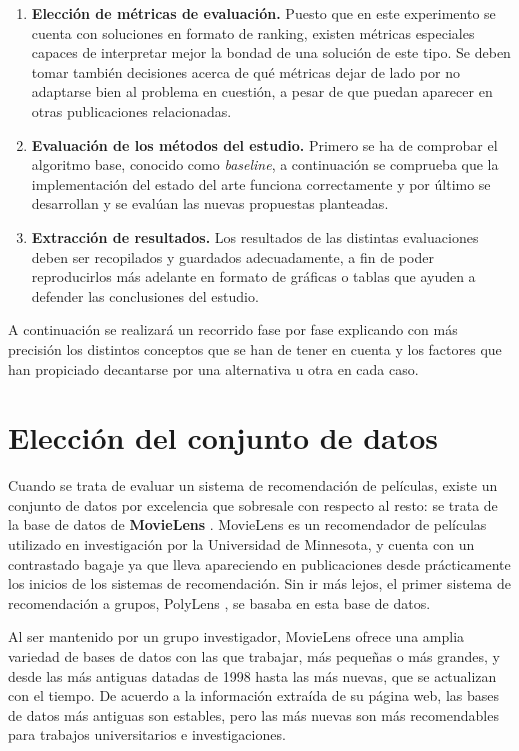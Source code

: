 \begin{enumerate}
	\item \textbf{Elección de métricas de evaluación.} Puesto que en este experimento se cuenta con soluciones en formato de ranking, existen métricas especiales capaces de interpretar mejor la bondad de una solución de este tipo. Se deben tomar también decisiones acerca de qué métricas dejar de lado por no adaptarse bien al problema en cuestión, a pesar de que puedan aparecer en otras publicaciones relacionadas.
	\item \textbf{Evaluación de los métodos del estudio.} Primero se ha de comprobar el algoritmo base, conocido como \textit{baseline}, a continuación se comprueba que la implementación del estado del arte funciona correctamente y por último se desarrollan y se evalúan las nuevas propuestas planteadas.
	\item \textbf{Extracción de resultados.} Los resultados de las distintas evaluaciones deben ser recopilados y guardados adecuadamente, a fin de poder reproducirlos más adelante en formato de gráficas o tablas que ayuden a defender las conclusiones del estudio.
\end{enumerate}

A continuación se realizará un recorrido fase por fase explicando con más precisión los distintos conceptos que se han de tener en cuenta y los factores que han propiciado decantarse por una alternativa u otra en cada caso.

\section{Elección del conjunto de datos}

Cuando se trata de evaluar un sistema de recomendación de películas, existe un conjunto de datos por excelencia que sobresale con respecto al resto: se trata de la base de datos de \textbf{MovieLens} \cite{movielens} \cite{movielens-paper}. MovieLens es un recomendador de películas utilizado en investigación por la Universidad de Minnesota, y cuenta con un contrastado bagaje ya que lleva apareciendo en publicaciones desde prácticamente los inicios de los sistemas de recomendación. Sin ir más lejos, el primer sistema de recomendación a grupos, PolyLens \cite{polylens}, se basaba en esta base de datos.

Al ser mantenido por un grupo investigador, MovieLens ofrece una amplia variedad de bases de datos con las que trabajar, más pequeñas o más grandes, y desde las más antiguas datadas de 1998 hasta las más nuevas, que se actualizan con el tiempo. De acuerdo a la información extraída de su página web, las bases de datos más antiguas son estables, pero las más nuevas son más recomendables para trabajos universitarios e investigaciones.

